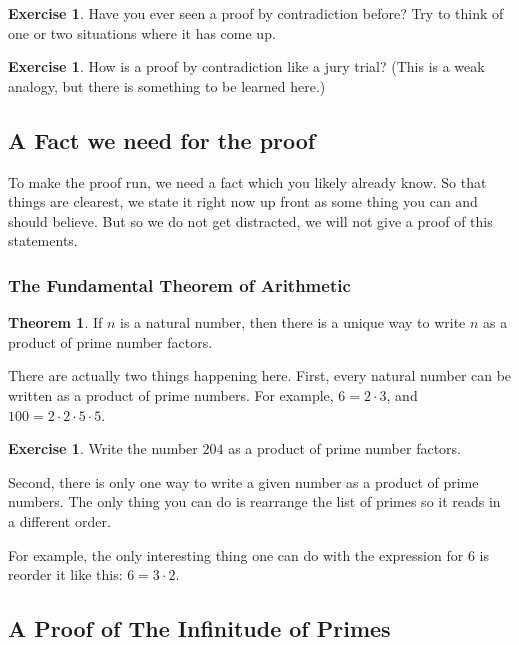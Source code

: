 \documentclass[12pt,letterpaper]{article}
\theoremstyle{definition}
\newtheorem{exercise}[question]{Exercise}
\newtheorem*{theorem}{Theorem}
\begin{document}
\begin{exercise}
Have you ever seen a proof by contradiction before?
Try to think of one or two situations where it has come up.
\end{exercise}

\begin{exercise}
How is a proof by contradiction like a jury trial?
(This is a weak analogy, but there is something to be learned here.)
\end{exercise}

\subsection*{A Fact we need for the proof}
To make the proof run, we need a fact which you likely already know.
So that things are clearest, we state it right now up front as some thing you can and should believe.
But so we do not get distracted, we will not give a proof of this statements.

\subsubsection*{The Fundamental Theorem of Arithmetic}

\begin{theorem}
If $n$ is a natural number, then there is a unique way to write $n$ as a product of prime number factors.
\end{theorem}

There are actually two things happening here.
First, every natural number can be written as a product of prime numbers.
For example, $6=2\cdot 3$, and $100 = 2\cdot 2 \cdot 5 \cdot 5$.

\begin{exercise}
Write the number $204$ as a product of prime number factors.
\end{exercise}

Second, there is only one way to write a given number as a product of prime numbers.
The only thing you can do is rearrange the list of primes so it reads in a different order.

For example, the only interesting thing one can do with the expression for $6$ is reorder it like this: $6 = 3\cdot 2$.

\subsection*{A Proof of The Infinitude of Primes}
\end{document}
